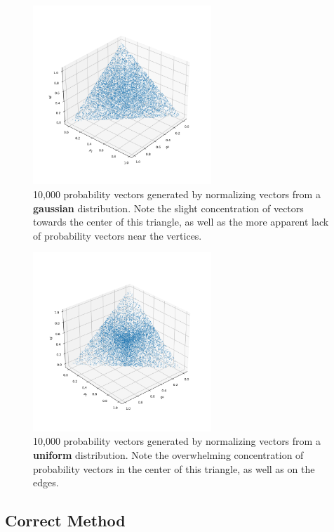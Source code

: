 \documentclass{paper}[11pt]
\begin{document}
	\begin{figure}[ht]
		\centering
		\includegraphics[width=0.6\textwidth]{prob_vecs_Gaussian.png}
		\caption{10,000 probability vectors generated by normalizing vectors from a \textbf{gaussian} distribution. Note the slight concentration of vectors towards the center of this triangle, as well as the more apparent lack of probability vectors near the vertices.}
		\label{fig:prob_vecs_gauss}
	\end{figure}
	\begin{figure}[ht]
		\centering
		\includegraphics[width=0.6\textwidth]{prob_vecs_Uniform.png}
		\caption{10,000 probability vectors generated by normalizing vectors from a \textbf{uniform} distribution. Note the overwhelming concentration of probability vectors in the center of this triangle, as well as on the edges.}
		\label{fig:prob_vecs_uniform}
	\end{figure}
	
	\subsection{Correct Method}
\end{document}

